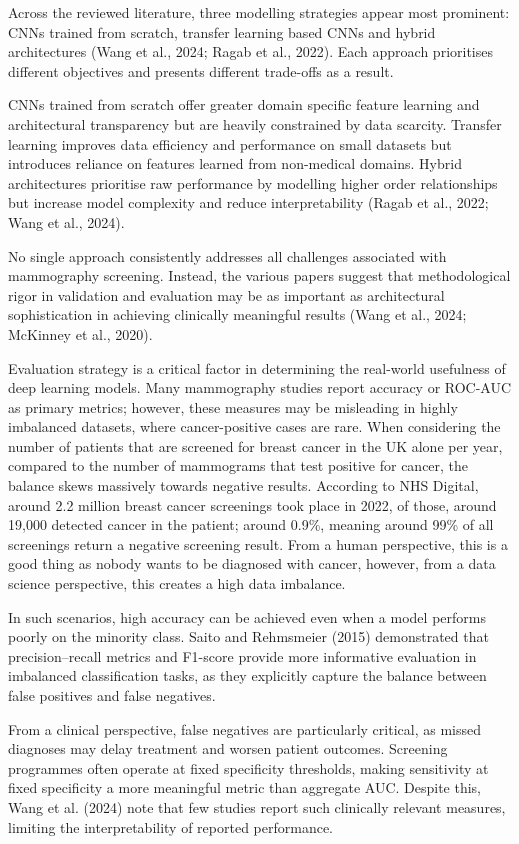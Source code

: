Across the reviewed literature, three modelling strategies appear most prominent: CNNs trained from scratch, transfer learning based CNNs and hybrid architectures (Wang et al., 2024; Ragab et al., 2022). Each approach prioritises different objectives and presents different trade-offs as a result.

CNNs trained from scratch offer greater domain specific feature learning and architectural transparency but are heavily constrained by data scarcity. Transfer learning improves data efficiency and performance on small datasets but introduces reliance on features learned from non-medical domains. Hybrid architectures prioritise raw performance by modelling higher order relationships but increase model complexity and reduce interpretability (Ragab et al., 2022; Wang et al., 2024).

No single approach consistently addresses all challenges associated with mammography screening. Instead, the various papers suggest that methodological rigor in validation and evaluation may be as important as architectural sophistication in achieving clinically meaningful results (Wang et al., 2024; McKinney et al., 2020).

Evaluation strategy is a critical factor in determining the real-world usefulness of deep learning models. Many mammography studies report accuracy or ROC-AUC as primary metrics; however, these measures may be misleading in highly imbalanced datasets, where cancer-positive cases are rare. When considering the number of patients that are screened for breast cancer in the UK alone per year, compared to the number of mammograms that test positive for cancer, the balance skews massively towards negative results. According to NHS Digital, around 2.2 million breast cancer screenings took place in 2022, of those, around 19,000 detected cancer in the patient; around 0.9\%, meaning around 99\% of all screenings return a negative screening result. From a human perspective, this is a good thing as nobody wants to be diagnosed with cancer, however, from a data science perspective, this creates a high data imbalance. 

In such scenarios, high accuracy can be achieved even when a model performs poorly on the minority class. Saito and Rehmsmeier (2015) demonstrated that precision–recall metrics and F1-score provide more informative evaluation in imbalanced classification tasks, as they explicitly capture the balance between false positives and false negatives.

From a clinical perspective, false negatives are particularly critical, as missed diagnoses may delay treatment and worsen patient outcomes. Screening programmes often operate at fixed specificity thresholds, making sensitivity at fixed specificity a more meaningful metric than aggregate AUC. Despite this, Wang et al. (2024) note that few studies report such clinically relevant measures, limiting the interpretability of reported performance.

